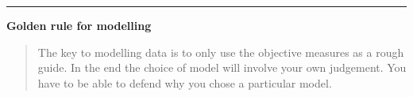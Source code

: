 \documentclass[
  letterpaper,
  DIV=11,
  numbers=noendperiod]{scrartcl}
\begin{document}
\begin{center}\rule{0.5\linewidth}{0.5pt}\end{center}

\textbf{Golden rule for modelling}

\begin{quote}
The key to modelling data is to only use the objective measures as a
rough guide. In the end the choice of model will involve your own
judgement. You have to be able to defend why you chose a particular
model.
\end{quote}
\end{document}
